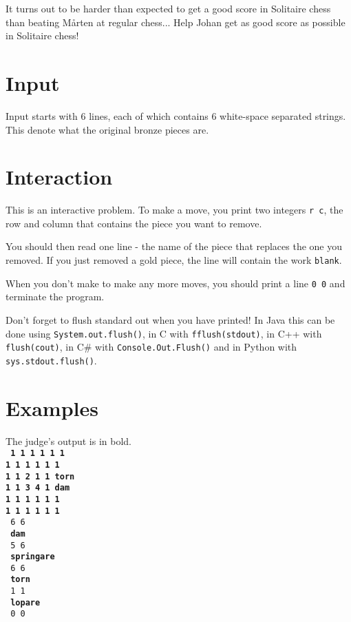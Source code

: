 It turns out to be harder than expected to get a good score in Solitaire chess than beating Mårten at regular chess... Help Johan get as good score as possible in Solitaire chess!

\section*{Input}
Input starts with 6 lines, each of which contains 6 white-space separated strings. This denote what the original bronze pieces are.

\section*{Interaction}
This is an interactive problem. To make a move, you print two integers \texttt{r c}, the row and column that contains the piece you want to remove.

You should then read one line - the name of the piece that replaces the one you removed. If you just removed a gold piece, the line will contain the work \texttt{blank}.

When you don't make to make any more moves, you should print a line \texttt{0 0} and terminate the program.

Don't forget to flush standard out when you have printed!
In Java this can be done using \texttt{System.out.flush()},
in C with \texttt{fflush(stdout)}, in C++ with \texttt{flush(cout)}, in C\# with \texttt{Console.Out.Flush()}
and in Python with \texttt{sys.stdout.flush()}.

\section*{Examples}
The judge's output is in bold.\\
\textbf{\texttt{
1 1 1 1 1 1 \\
1 1 1 1 1 1 \\
1 1 2 1 1 torn \\
1 1 3 4 1 dam \\
1 1 1 1 1 1 \\
1 1 1 1 1 1 \\
}}
\texttt{
6 6 \\
}
\textbf{\texttt{
dam \\
}}
\texttt{
5 6 \\
}
\textbf{\texttt{
springare \\
}}
\texttt{
6 6 \\
}
\textbf{\texttt{
torn \\
}}
\texttt{
1 1 \\
}
\textbf{\texttt{
lopare \\
}}
\texttt{
0 0 \\
}

